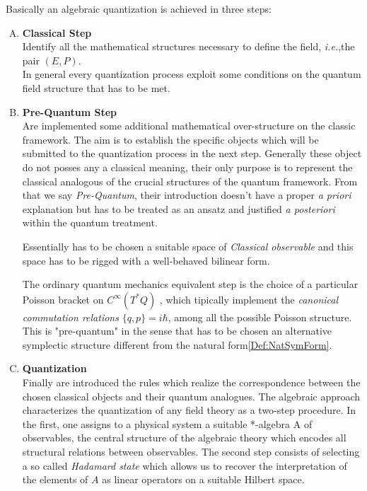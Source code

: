 \documentclass[Main]{subfiles}
\begin{document}
Basically an algebraic quantization is achieved in three steps:
\begin{enumerate}[A)]
	\item \textbf{Classical Step}\\
		Identify all the mathematical structures necessary to define the field, \textit{i.e.},the pair $(E,P)$.\\
		In general every quantization process exploit some conditions on the quantum field structure that has to be met.
	\item \textbf{Pre-Quantum Step}\\
		\danger Are implemented %
		some additional mathematical over-structure  on the classic framework. The aim is to establish the specific objects which will be submitted to the quantization process in the next step. 
		Generally these object do not posses any a classical meaning, their only purpose is to represent the classical analogous of the crucial structures of the quantum framework. 
		From that we say \emph{Pre-Quantum}, their introduction doesn't have a proper \emph{a priori} explanation but has to be treated as an ansatz and justified \emph{a posteriori} within the quantum treatment.
		
		Essentially has to be chosen a suitable space of \emph{Classical observable} and this space has to be rigged with a well-behaved bilinear form.
		
		The ordinary quantum mechanics equivalent step is the choice of a particular Poisson bracket on $C^\infty(T^*Q)$ , which tipically implement the \emph{canonical commutation relations} $\{q,p\}=i\hbar$, among all the possible Poisson structure. 
		This is "pre-quantum" in the sense that has to be chosen an alternative symplectic structure different from the natural form\ref{Def:NatSymForm}.
		
		
	\item \textbf{Quantization}\\
		Finally are introduced the rules which realize the correspondence between the chosen classical objects and their quantum analogues.
		The algebraic approach characterizes the quantization of any field theory as a two-step procedure. 
		In the first, one assigns to a physical system a suitable *-algebra A of observables, the central structure of the algebraic theory which encodes all structural relations between observables. 
		The second step consists of selecting a so called \emph{Hadamard state} which allows us to recover the interpretation of the elements of $A$ as linear operators on a suitable Hilbert space.
\end{enumerate}
\end{document}
